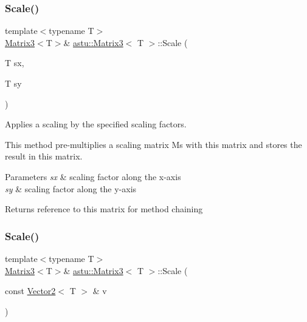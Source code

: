 \subsubsection{\texorpdfstring{Scale()}{Scale()}\hspace{0.1cm}{\footnotesize\ttfamily [1/2]}}
{\footnotesize\ttfamily template$<$typename T$>$ \\
\hyperlink{classastu_1_1Matrix3}{Matrix3}$<$T$>$\& \hyperlink{classastu_1_1Matrix3}{astu\+::\+Matrix3}$<$ T $>$\+::Scale (\begin{DoxyParamCaption}\item[{T}]{sx,  }\item[{T}]{sy }\end{DoxyParamCaption})\hspace{0.3cm}{\ttfamily [inline]}}

Applies a scaling by the specified scaling factors.

This method pre-\/multiplies a scaling matrix \textquotesingle{}Ms\textquotesingle{} with this matrix and stores the result in this matrix.


\begin{DoxyParams}{Parameters}
{\em sx} & scaling factor along the x-\/axis \\
\hline
{\em sy} & scaling factor along the y-\/axis \\
\hline
\end{DoxyParams}
\begin{DoxyReturn}{Returns}
reference to this matrix for method chaining 
\end{DoxyReturn}
\mbox{\label{classastu_1_1Matrix3_ab8f629433a5f3cae4da890b1e22dd4f4}} 
\subsubsection{\texorpdfstring{Scale()}{Scale()}\hspace{0.1cm}{\footnotesize\ttfamily [2/2]}}
{\footnotesize\ttfamily template$<$typename T$>$ \\
\hyperlink{classastu_1_1Matrix3}{Matrix3}$<$T$>$\& \hyperlink{classastu_1_1Matrix3}{astu\+::\+Matrix3}$<$ T $>$\+::Scale (\begin{DoxyParamCaption}\item[{const \hyperlink{classastu_1_1Vector2}{Vector2}$<$ T $>$ \&}]{v }\end{DoxyParamCaption})\hspace{0.3cm}{\ttfamily [inline]}}

